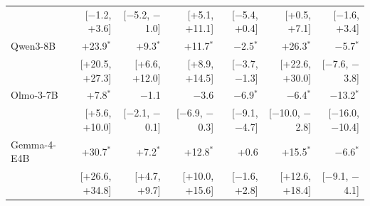 \begin{tabular}{lrrrrrr}
 & [$-$1.2, +3.6] & [$-$5.2, $-$1.0] & [+5.1, +11.1] & [$-$5.4, +0.4] & [+0.5, +7.1] & [$-$1.6, +3.4] \\[2pt]
Qwen3-8B & +23.9$^{*}$ & +9.3$^{*}$ & +11.7$^{*}$ & $-$2.5$^{*}$ & +26.3$^{*}$ & $-$5.7$^{*}$ \\
 & [+20.5, +27.3] & [+6.6, +12.0] & [+8.9, +14.5] & [$-$3.7, $-$1.3] & [+22.6, +30.0] & [$-$7.6, $-$3.8] \\[2pt]
Olmo-3-7B & +7.8$^{*}$ & $-$1.1 & $-$3.6 & $-$6.9$^{*}$ & $-$6.4$^{*}$ & $-$13.2$^{*}$ \\
 & [+5.6, +10.0] & [$-$2.1, $-$0.1] & [$-$6.9, $-$0.3] & [$-$9.1, $-$4.7] & [$-$10.0, $-$2.8] & [$-$16.0, $-$10.4] \\[2pt]
Gemma-4-E4B & +30.7$^{*}$ & +7.2$^{*}$ & +12.8$^{*}$ & +0.6 & +15.5$^{*}$ & $-$6.6$^{*}$ \\
 & [+26.6, +34.8] & [+4.7, +9.7] & [+10.0, +15.6] & [$-$1.6, +2.8] & [+12.6, +18.4] & [$-$9.1, $-$4.1] \\
\bottomrule
\end{tabular}
